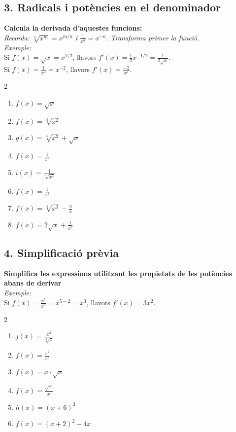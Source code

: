 \documentclass[12pt,a4paper]{article}
\begin{document}
\subsection*{3. Radicals i potències en el denominador}
\textbf{Calcula la derivada d'aquestes funcions: } \\[0.2cm]
\textit{Recorda: $\sqrt[n]{x^m} = x^{m/n}$ i $\frac{1}{x^n} = x^{-n}$. Transforma primer la funció.}\\[0.2cm]
\textit{Exemple:} \\ [0.2cm]
Si $f(x) = \sqrt{x} = x^{1/2}$, llavors $f'(x) = \frac{1}{2}x^{-1/2} = \frac{1}{2\sqrt{x}}$. \\[0.2cm]
Si $f(x) = \frac{1}{x^2} = x^{-2}$, llavors $f'(x) = \frac{-2}{x^3}$.

\begin{multicols}{2}
\begin{enumerate}[label=\alph*)]
    \item $f(x) = \sqrt{x}$
    \item $f(x) = \sqrt[3]{x^2}$
    \item $g(x) = \sqrt[4]{x^3} + \sqrt{x}$
    \item $f(x) = \frac{1}{x^2}$
    \item $i(x) = \frac{1}{\sqrt[4]{x^3}}$
    \item $f(x) = \frac{1}{x^3}$
    \item $f(x) = \sqrt[4]{x^3} - \frac{2}{x}$
    \item $f(x) = 2\sqrt{x} + \frac{1}{x^2}$
\end{enumerate}
\end{multicols}

\subsection*{4. Simplificació prèvia}
\textbf{Simplifica les expressions utilitzant les propietats de les potències abans de derivar} \\[0.2cm]
\textit{Exemple:} \\[0.2cm]
Si $f(x) = \frac{x^5}{x^2} = x^{5-2} = x^3$, llavors $f'(x) = 3x^2$. \\ [0.2cm]

\begin{multicols}{2}
\begin{enumerate}[label=\alph*)]
    \item $j(x) = \frac{x^2}{\sqrt[3]{x}}$
    \item $f(x) = \frac{x^2}{x^5}$
    \item $f(x) = x \cdot \sqrt{x}$
    \item $f(x) = \frac{\sqrt{x}}{x}$
    \item $h(x) = (x+6)^2$
    \item $f(x) = (x+2)^2 - 4x$
\end{enumerate}
\end{multicols}
\end{document}
